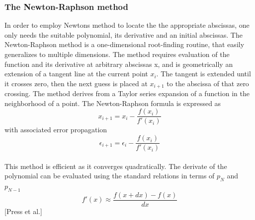 \documentclass[%
reprint,nofootinbib,
amsmath,amssymb,
aps,
]{revtex4-1}
\begin{document}
\subsubsection{The Newton-Raphson method} \noindent 
In order to employ Newtons method to locate the the appropriate abscissas, one only needs the suitable polynomial, its derivative and an initial abscissas.  The Newton-Raphson method is a one-dimensional root-finding routine, that easily generalizes to multiple dimensions. The method requires evaluation of the function and its derivative at arbitrary abscissas x, and is geometrically an extension of a tangent line at the current point $x_i$. The tangent is extended until it crosses zero, then the next guess is placed at $x_{i+1}$ to the abscissa of that zero crossing. The method derives from a Taylor series expansion of a function in the neighborhood of a point. The Newton-Raphson formula is expressed as \vspace{2mm} \\
\begin{equation*}
	x_{i+1} = x_i -\dfrac{f(x_i)}{f'(x_i)}
\end{equation*}
with associated error propagation\vspace{2mm} \\
\begin{equation}\label{newton}
	\epsilon_{i+1} = \epsilon_i  -\dfrac{f(x_i)}{f'(x_i)}
\end{equation}\vspace{2mm} \\
This method is efficient as it converges quadratically. The derivate of the polynomial can be evaluated using the standard relations in terms of $p_N$ and $p_{N-1}$ \vspace{2mm} \\
\begin{equation*}
	f'(x) \approx \dfrac{f(x+dx)- f(x)}{dx}
\end{equation*}\vspace{2mm} 
 \hspace{65mm} [Press et al.]
\end{document}
